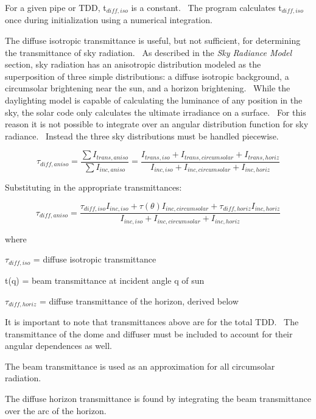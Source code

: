 For a given pipe or TDD, t\(_{diff,iso}\) is a constant.~ The program calculates t\(_{diff,iso}\) once during initialization using a numerical integration.

The diffuse isotropic transmittance is useful, but not sufficient, for determining the transmittance of sky radiation.~ As described in the \emph{Sky Radiance Model} section, sky radiation has an anisotropic distribution modeled as the superposition of three simple distributions: a diffuse isotropic background, a circumsolar brightening near the sun, and a horizon brightening.~ While the daylighting model is capable of calculating the luminance of any position in the sky, the solar code only calculates the ultimate irradiance on a surface.~ For this reason it is not possible to integrate over an angular distribution function for sky radiance.~ Instead the three sky distributions must be handled piecewise.

\begin{equation}
{\tau_{diff,aniso}} = \frac{{\sum {{I_{trans,aniso}}} }}{{\sum {{I_{inc,aniso}}} }} = \frac{{{I_{trans,iso}} + {I_{trans,circumsolar}} + {I_{trans,horiz}}}}{{{I_{inc,iso}} + {I_{inc,circumsolar}} + {I_{inc,horiz}}}}
\end{equation}

Substituting in the appropriate transmittances:

\begin{equation}
{\tau_{diff,aniso}} = \frac{{{\tau_{diff,iso}}{I_{inc,iso}} + \tau (\theta ){I_{inc,circumsolar}} + {\tau_{diff,horiz}}{I_{inc,horiz}}}}{{{I_{inc,iso}} + {I_{inc,circumsolar}} + {I_{inc,horiz}}}}
\end{equation}

where

\(\tau_{diff,iso}\) = diffuse isotropic transmittance

t(q) = beam transmittance at incident angle q of sun

\(\tau_{diff,horiz}\) = diffuse transmittance of the horizon, derived below

It is important to note that transmittances above are for the total TDD.~ The transmittance of the dome and diffuser must be included to account for their angular dependences as well.

The beam transmittance is used as an approximation for all circumsolar radiation.

The diffuse horizon transmittance is found by integrating the beam transmittance over the arc of the horizon.


